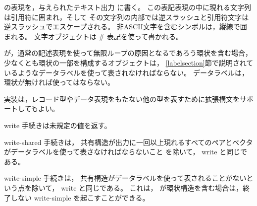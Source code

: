 \begin{entry}{%
}

 の表現を，与えられたテキスト出力  に書く。
この表記表現の中に現れる文字列は引用符に囲まれ，そして
その文字列の内部では逆スラッシュと引用符文字は逆スラッシュでエスケープされる。
非ASCII文字を含むシンボルは，縦線で囲まれる。
文字オブジェクトは {\cf \#\backwhack} 表記を使って書かれる。

 が，通常の記述表現を使って無限ループの原因となるであろう環状を含む場合，
少なくとも環状の一部を構成するオブジェクトは，
\ref{labelsection}節で説明されているようなデータラベルを使って表されなければならない。
データラベルは，環状が無ければ使ってはならない。

実装は，レコード型やデータ表現をもたない他の型を表すために拡張構文をサポートしてもよい。

{\cf write} 手続きは未規定の値を返す。

\end{entry}

\begin{entry}{%
}

{\cf write-shared} 手続きは，
共有構造が出力に一回以上現れるすべてのペアとベクタがデータラベルを使って表さなければならないこと
を除いて， {\cf write} と同じである。

\end{entry}

\begin{entry}{%
}

{\cf write-simple} 手続きは，
共有構造がデータラベルを使って表されることがないという点を除いて， {\cf write} と同じである。
これは，  が環状構造を含む場合は，終了しない {\cf write-simple} を起こすことができる。

\end{entry}


